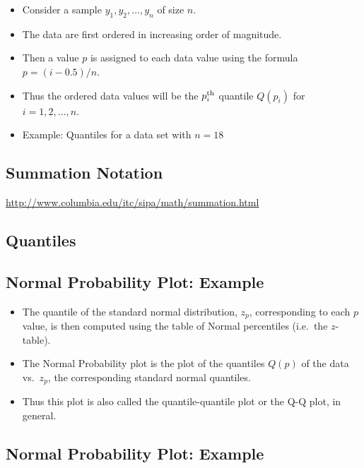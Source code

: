 \documentclass[
  letterpaper,
  DIV=11,
  numbers=noendperiod]{scrartcl}
\begin{document}
\begin{itemize}
\item
  Consider a sample \(y_1, y_2, \ldots, y_n\) of size \(n\).
\item
  The data are first ordered in increasing order of magnitude.
\item
  Then a value \(p\) is assigned to each data value using the formula
  \(p = (i -0.5)/n\).
\item
  Thus the ordered data values will be the \(p_i^{\rm th}\) quantile
  \(Q(p_i)\) for \(i=1,2,\ldots,n.\)
\item
  Example: Quantiles for a data set with \(n = 18\)
\end{itemize}

\subsection{Summation Notation}\label{summation-notation}

\url{http://www.columbia.edu/itc/sipa/math/summation.html}

\subsection{Quantiles}\label{quantiles}

\subsection{Normal Probability Plot:
Example}\label{normal-probability-plot-example}

\begin{itemize}
\item
  The quantile of the standard normal distribution, \(z_p\),
  corresponding to each \(p\) value, is then computed using the table of
  Normal percentiles (i.e.~the \(z\)-table).
\item
  The Normal Probability plot is the plot of the quantiles \(Q(p)\) of
  the data vs.~\(z_p\), the corresponding standard normal quantiles.
\item
  Thus this plot is also called the quantile-quantile plot or the Q-Q
  plot, in general.
\end{itemize}

\subsection{Normal Probability Plot:
Example}\label{normal-probability-plot-example-1}
\end{document}
